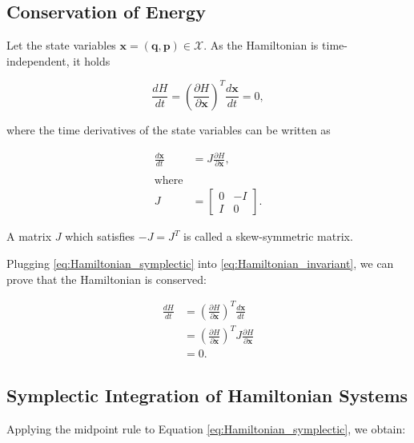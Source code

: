 \documentclass[
	parskip, 			   %
	twoside, 			   %
	DIV=14, 			   %
	BCOR=15.0mm, 		   %
	headsepline, 		   %
	open=right, 		   %
	captions=tableheading, %
	bibliography=totoc,    %
	numbers=noenddot       %
]{scrreprt}
\begin{document}
\subsection{Conservation of Energy}
Let the state variables $\mathbf{x}=(\mathbf{q},\mathbf{p}) \in \mathcal{X}$. As the Hamiltonian is time-independent, it holds

\begin{equation}
    \label{eq:Hamiltonian_invariant}
    \frac{dH}{dt} = \left(\frac{\partial H}{\partial \mathbf{x}}\right)^T \frac{d\mathbf{x}}{dt} = 0,
\end{equation}

where the time derivatives of the state variables can be written as

\begin{equation}
    \label{eq:Hamiltonian_symplectic}
    \begin{aligned}
        \frac{d\mathbf{x}}{dt} &= J \frac{\partial H}{\partial \mathbf{x}},\\\\
        \text{where}\\
        J &= \left[ \begin{array}{cc}
            0 & -I \\
            I & 0
        \end{array} \right].
    \end{aligned}
\end{equation}

A matrix $J$ which satisfies $-J = J^T$ is called a skew-symmetric matrix.

Plugging \ref{eq:Hamiltonian_symplectic} into \ref{eq:Hamiltonian_invariant}, we can prove that the Hamiltonian is conserved:

\begin{equation}
    \label{eq:Hamiltonian_symplectic_conclusion}
    \begin{aligned}
        \frac{dH}{dt} &= \left(\frac{\partial H}{\partial \mathbf{x}}\right)^T \frac{d\mathbf{x}}{dt}\\
         &= \left(\frac{\partial H}{\partial \mathbf{x}}\right)^T J \frac{\partial H}{\partial \mathbf{x}} \\
         &= 0.
    \end{aligned}
\end{equation}

\subsection{Symplectic Integration of Hamiltonian Systems}
Applying the midpoint rule to Equation \ref{eq:Hamiltonian_symplectic}, we obtain:
\end{document}
